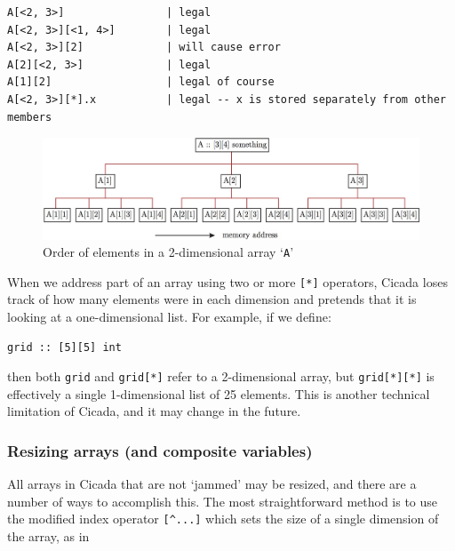 \documentclass{article}
\newenvironment{code}{
       \begin{list}{}{
               \setlength{\leftmargin}{.4in}
               \setlength{\rightmargin}{0in}
               \setlength{\topsep}{.2in}
       }
       \small
       \item[] }
       { \end{list}   }
\begin{document}
\begin{code} \begin{verbatim}
A[<2, 3>]                | legal
A[<2, 3>][<1, 4>]        | legal
A[<2, 3>][2]             | will cause error
A[2][<2, 3>]             | legal
A[1][2]                  | legal of course
A[<2, 3>][*].x           | legal -- x is stored separately from other members
\end{verbatim} \end{code}

\begin{figure}
\centering
\includegraphics[width=\textwidth]{arrays}
\caption{Order of elements in a 2-dimensional array `\texttt{A}'}
\label{arrayElementOrder}
\end{figure}

When we address part of an array using two or more \verb#[*]# operators, Cicada loses track of how many elements were in each dimension and pretends that it is looking at a one-dimensional list.  For example, if we define:

\begin{code} \begin{verbatim}
grid :: [5][5] int
\end{verbatim} \end{code}

\noindent then both \verb#grid# and \verb#grid[*]# refer to a 2-dimensional array, but \verb#grid[*][*]# is effectively a single 1-dimensional list of 25 elements.  This is another technical limitation of Cicada, and it may change in the future.



\subsubsection{Resizing arrays (and composite variables)} 

All arrays in Cicada that are not `jammed' may be resized, and there are a number of ways to accomplish this.  The most straightforward method is to use the modified index operator \verb#[^...]# which sets the size of a single dimension of the array, as in
\end{document}

